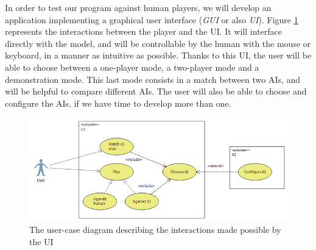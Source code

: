 In order to test our program against human players, we will develop an application implementing a graphical user interface (\emph{GUI} or also \emph{UI}).
Figure \ref{fig:UCD_Play} represents the interactions between the player and the UI.
It will interface directly with the model, and will be controllable by the human with the mouse or keyboard, in a manner as intuitive as possible.
Thanks to this UI, the user will be able to choose between a one-player mode, a two-player mode and a demonstration mode.
This last mode consists in a match between two AIs, and will be helpful to compare different AIs.
The user will also be able to choose and configure the AIs, if we have time to develop more than one.

\begin{figure}[H]
\centering
\includegraphics[width=\textwidth]{2General_Architecture/2.1Behaviour_of_the_Game/Pictures/Application_UCD}
\caption{The user-case diagram describing the interactions made possible by the UI}
\label{fig:UCD_Play}
\end{figure}
\clearpage
